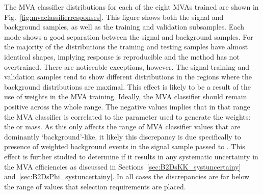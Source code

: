 The MVA classifier distributions for each of the eight MVAs trained are shown in Fig.~\ref{fig:mvaclassifierresponses}. This figure shows both the signal and background samples, as well as the training and validation subsamples. Each mode shows a good separation between the signal and background samples. For the majority of the distributions the training and testing samples have almost identical shapes, implying response is reproducible and the method has not overtrained. There are noticeable exceptions, however. The signal training and validation samples tend to show different distributions in the regions where the background distributions are maximal. This effect is likely to be a result of the use of weights in the MVA training. Ideally, the MVA classifier should remain positive across the whole range. The negative values implies that in that range the MVA classifier is correlated to the parameter used to generate the weights: the \phiz or \Dsp mass. As this only affects the range of MVA classifier values that are dominantly `background'-like, it likely this discrepancy is due specifically to presence of weighted background events in the signal sample passed to \tmva.
This effect is further studied to determine if it results in any systematic uncertainty in the MVA efficiencies as discussed in Sections~\ref{sec:B2DsKK_systuncertainy} and~\ref{sec:B2DsPhi_systuncertainy}. In all cases the discrepancies are far below the range of values that selection requirements are placed. 

